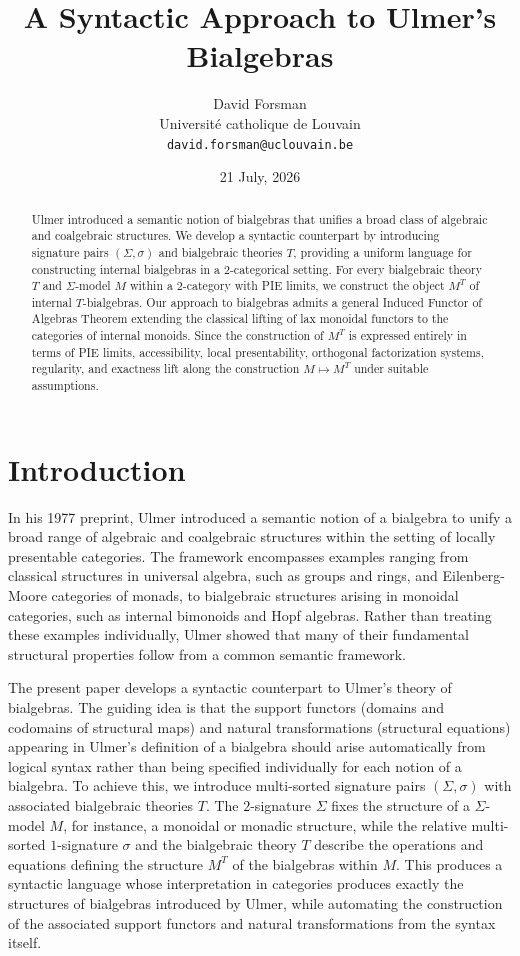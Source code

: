 \documentclass[11pt]{article}
\author{David Forsman\\
Université catholique de Louvain\\
\texttt{david.forsman@uclouvain.be}}
\title{A Syntactic Approach to Ulmer's Bialgebras}
\date{21 July, 2026}
\theoremstyle{plain}
\theoremstyle{definition}
\numberwithin{equation}{section}
\begin{document}
\maketitle

\begin{abstract}
Ulmer introduced a semantic notion of bialgebras that unifies a broad class of algebraic and coalgebraic structures. We develop a syntactic counterpart by introducing signature pairs $(\Sigma,\sigma)$ and bialgebraic theories $T$, providing a uniform language for constructing internal bialgebras in a $2$-categorical setting. For every bialgebraic theory $T$ and $\Sigma$-model $M$ within a $2$-category with PIE limits, we construct the object $M^T$ of internal $T$-bialgebras. Our approach to bialgebras admits a general Induced Functor of Algebras Theorem extending the classical lifting of lax monoidal functors to the categories of internal monoids. Since the construction of $M^T$ is expressed entirely in terms of PIE limits, accessibility, local presentability, orthogonal factorization systems, regularity, and exactness lift along the construction $M \mapsto M^T$ under suitable assumptions.
\end{abstract}
\section{Introduction}

In his 1977 preprint, Ulmer \cite{Ulmer1977Bialgebras} introduced a semantic notion of a bialgebra to unify a broad range of algebraic and coalgebraic structures within the setting of locally presentable categories. The framework encompasses examples ranging from classical structures in universal algebra, such as groups and rings, and Eilenberg-Moore categories of monads, to bialgebraic structures arising in monoidal categories, such as internal bimonoids and Hopf algebras. Rather than treating these examples individually, Ulmer showed that many of their fundamental structural properties follow from a common semantic framework.

The present paper develops a syntactic counterpart to Ulmer's theory of bialgebras. The guiding idea is that the support functors (domains and codomains of structural maps) and natural transformations (structural equations) appearing in Ulmer's definition of a bialgebra should arise automatically from logical syntax rather than being specified individually for each notion of a bialgebra. To achieve this, we introduce multi-sorted signature pairs $(\Sigma,\sigma)$ with associated bialgebraic theories $T$. The $2$-signature $\Sigma$ fixes the structure of a $\Sigma$-model $M$, for instance, a monoidal or monadic structure, while the relative multi-sorted $1$-signature $\sigma$ and the bialgebraic theory $T$ describe the operations and equations defining the structure $M^T$ of the bialgebras within $M$. This produces a syntactic language whose interpretation in categories produces exactly the structures of bialgebras introduced by Ulmer, while automating the construction of the associated support functors and natural transformations from the syntax itself.
\end{document}
